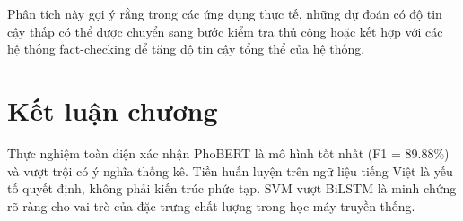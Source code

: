 \documentclass[12pt, a4paper]{report}
\newcommand{\phobert}{PhoBERT\xspace}
\newcommand{\phobertFone}{89.88}
\begin{document}
Phân tích này gợi ý rằng trong các ứng dụng thực tế, 
những dự đoán có độ tin cậy thấp có thể được chuyển sang bước kiểm tra thủ công 
hoặc kết hợp với các hệ thống fact-checking để tăng độ tin cậy tổng thể của hệ thống.

\section{Kết luận chương}

Thực nghiệm toàn diện xác nhận \phobert là mô hình tốt nhất (F1 = \phobertFone\%) và vượt trội có ý nghĩa thống kê. Tiền huấn luyện trên ngữ liệu tiếng Việt là yếu tố quyết định, không phải kiến trúc phức tạp. SVM vượt BiLSTM là minh chứng rõ ràng cho vai trò của đặc trưng chất lượng trong học máy truyền thống.

\end{document}
